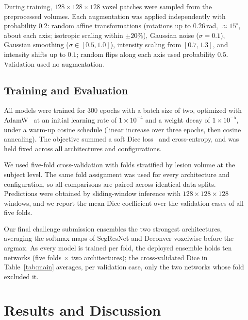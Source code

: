 \documentclass[runningheads,a4paper]{llncs}
\begin{document}
During training, $128\times128\times128$ voxel patches were sampled from the preprocessed volumes. Each augmentation was applied independently with probability $0.2$: random affine transformations (rotations up to $0.26$\,rad, ${\approx}15^\circ$, about each axis; isotropic scaling within $\pm20\%$), Gaussian noise ($\sigma{=}0.1$), Gaussian smoothing ($\sigma\in[0.5,1.0]$), intensity scaling from $[0.7,1.3]$, and intensity shifts up to $0.1$; random flips along each axis used probability $0.5$. Validation used no augmentation.

\subsection{Training and Evaluation}

All models were trained for 300 epochs with a batch size of two, optimized with AdamW~\cite{loshchilov2019decoupled} at an initial learning rate of $1\times10^{-4}$ and a weight decay of $1\times10^{-5}$, under a warm-up cosine schedule (linear increase over three epochs, then cosine annealing). The objective summed a soft Dice loss~\cite{milletari2016vnet} and cross-entropy, and was held fixed across all architectures and configurations.

We used five-fold cross-validation with folds stratified by lesion volume at the subject level. The same fold assignment was used for every architecture and configuration, so all comparisons are paired across identical data splits. Predictions were obtained by sliding-window inference with $128\times128\times128$ windows, and we report the mean Dice coefficient over the validation cases of all five folds.

Our final challenge submission ensembles the two strongest architectures, averaging the softmax maps of SegResNet and Deconver voxelwise before the argmax. As every model is trained per fold, the deployed ensemble holds ten networks (five folds $\times$ two architectures); the cross-validated Dice in Table~\ref{tab:main} averages, per validation case, only the two networks whose fold excluded it.

\section{Results and Discussion}
\label{sec:results}
\end{document}
